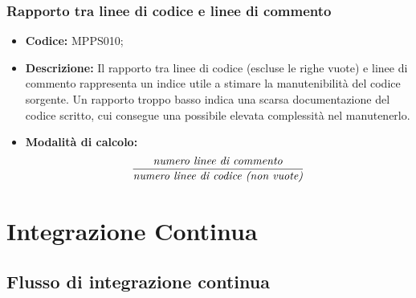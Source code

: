 \documentclass[../NormediProgetto.tex]{subfiles}
\begin{document}
\subsubsection{Rapporto tra linee di codice e linee di commento}

\begin{itemize}
	
	\item \textbf{Codice:} MPPS010;
	
	\item \textbf{Descrizione:} Il rapporto tra linee di codice (escluse le righe vuote) e linee di commento rappresenta un indice utile a stimare la manutenibilità del codice sorgente. Un rapporto troppo basso indica una scarsa documentazione del codice scritto, cui consegue una possibile elevata complessità nel manutenerlo.
	
	\item \textbf{Modalità di calcolo:}
	\[\frac{\textrm{\textit{numero linee di commento}}}{\textrm{\textit{numero linee di codice (non vuote)}}} \]
\end{itemize}

\section{Integrazione Continua}
\subsection{Flusso di integrazione continua}
\end{document}
